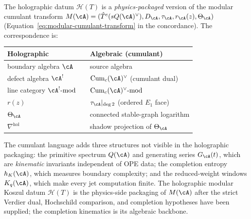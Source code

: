 \begin{remark}
\label{rem:holographic-cumulant-comparison}
The holographic datum $\mathcal{H}(T)$ is a
\emph{physics-packaged} version of the modular cumulant transform
$M(\cA) = (\hat{T}^c(sQ(\cA)^\vee), D_\cA, \tau_\cA, r_\cA(z),
\Theta_\cA)$
(Equation~\eqref{eq:modular-cumulant-transform} in the
concordance). The correspondence is:
\begin{center}
\small
\begin{tabular}{lcl}
\textbf{Holographic} && \textbf{Algebraic (cumulant)} \\
\hline
boundary algebra $\cA$ && source algebra \\[2pt]
defect algebra $\cA^!$ &&
 $\operatorname{Cum}_c(\cA)^\vee$ (cumulant dual) \\[2pt]
line category $\cA^!\text{-mod}$ &&
 $\operatorname{Cum}_c(\cA)^\vee\text{-mod}$ \\[2pt]
$r(z)$ && $\tau_\cA|_{\deg 2}$ (ordered $E_1$ face) \\[2pt]
$\Theta_\cA$ && connected stable-graph logarithm \\[2pt]
$\nabla^{\mathrm{hol}}$ && shadow projection of $\Theta_\cA$
\end{tabular}
\end{center}
The cumulant language adds three structures not visible in the
holographic packaging: the primitive spectrum $Q(\cA)$ and
generating series $G_\cA(t)$, which are \emph{kinematic} invariants
independent of OPE data; the completion entropy $h_K(\cA)$, which
measures boundary complexity; and the reduced-weight windows
$K_q(\cA)$, which make every jet computation finite. The
holographic modular Koszul datum $\mathcal{H}(T)$ is the
physics-side packaging of $M(\cA)$ after the strict Verdier dual,
Hochschild comparison, and completion hypotheses have been supplied;
the completion kinematics is its algebraic backbone.
\end{remark}

